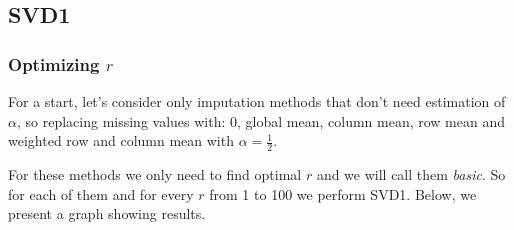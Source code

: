 \documentclass[11pt]{amsart}
\begin{document}
\subsection*{SVD1}
\subsubsection*{Optimizing $r$}
For a start, let's consider only imputation methods that don't need estimation of $\alpha$, so replacing missing values with: 0, global mean, column mean, row mean and weighted row and column mean with $\alpha = \frac{1}{2}$.

For these methods we only need to find optimal $r$ and we will call them \textit{basic}.
So for each of them and for every $r$ from 1 to 100 we perform SVD1.
Below, we present a graph showing results.
\end{document}
